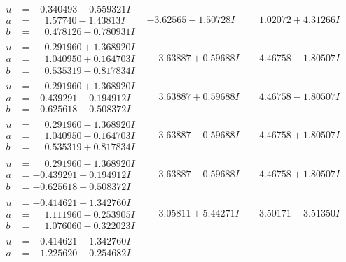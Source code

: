 \documentclass[1p]{elsarticle_modified}
\theoremstyle{definition}
\begin{document}
$$\begin{array}{c|c|c}
\begin{aligned}
u &= -0.340493 - 0.559321 I \\
a &= \phantom{-}1.57740 - 1.43813 I \\
b &= \phantom{-}0.478126 - 0.780931 I\end{aligned}
 & -3.62565 - 1.50728 I & \phantom{-}1.02072 + 4.31266 I \\ \hline\begin{aligned}
u &= \phantom{-}0.291960 + 1.368920 I \\
a &= \phantom{-}1.040950 + 0.164703 I \\
b &= \phantom{-}0.535319 - 0.817834 I\end{aligned}
 & \phantom{-}3.63887 + 0.59688 I & \phantom{-}4.46758 - 1.80507 I \\ \hline\begin{aligned}
u &= \phantom{-}0.291960 + 1.368920 I \\
a &= -0.439291 - 0.194912 I \\
b &= -0.625618 - 0.508372 I\end{aligned}
 & \phantom{-}3.63887 + 0.59688 I & \phantom{-}4.46758 - 1.80507 I \\ \hline\begin{aligned}
u &= \phantom{-}0.291960 - 1.368920 I \\
a &= \phantom{-}1.040950 - 0.164703 I \\
b &= \phantom{-}0.535319 + 0.817834 I\end{aligned}
 & \phantom{-}3.63887 - 0.59688 I & \phantom{-}4.46758 + 1.80507 I \\ \hline\begin{aligned}
u &= \phantom{-}0.291960 - 1.368920 I \\
a &= -0.439291 + 0.194912 I \\
b &= -0.625618 + 0.508372 I\end{aligned}
 & \phantom{-}3.63887 - 0.59688 I & \phantom{-}4.46758 + 1.80507 I \\ \hline\begin{aligned}
u &= -0.414621 + 1.342760 I \\
a &= \phantom{-}1.111960 - 0.253905 I \\
b &= \phantom{-}1.076060 - 0.322023 I\end{aligned}
 & \phantom{-}3.05811 + 5.44271 I & \phantom{-}3.50171 - 3.51350 I \\ \hline\begin{aligned}
u &= -0.414621 + 1.342760 I \\
a &= -1.225620 - 0.254682 I \\

\end{aligned}
\end{array}$$
\end{document}
